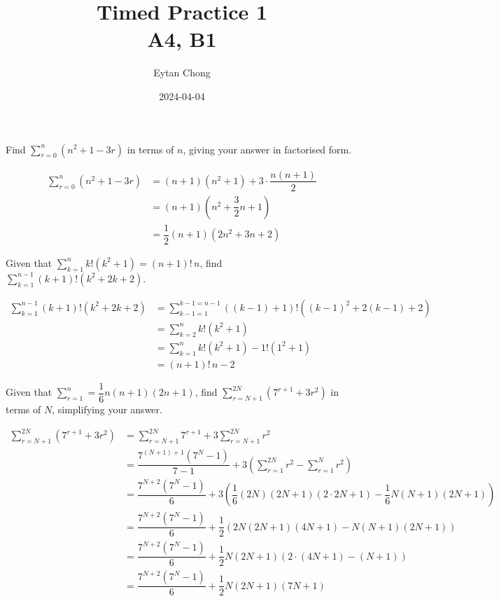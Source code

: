\documentclass{echw}
\title{Timed Practice 1\\A4, B1}
\author{Eytan Chong}
\date{2024-04-04}
\begin{document}
    \problem{}
        Find $\sum\limits_{r = 0}^n \left(n^2 + 1 - 3r\right)$ in terms of $n$, giving your answer in factorised form.

    \solution
        \begin{align*}
            \sum_{r = 0}^n \left(n^2 + 1 - 3r\right) &= (n+1)(n^2 + 1) + 3 \cdot \dfrac{n(n+1)}2\\
            &= (n+1)\left(n^2 + \dfrac32 n + 1\right)\\
            &= \dfrac12 (n+1)(2n^2 + 3n + 2)
        \end{align*}


    \problem{}
        Given that $\sum\limits_{k=1}^n k!\left(k^2 + 1\right) = (n+1)!\,n$, find $\sum\limits_{k=1}^{n-1} (k+1)!\left(k^2 + 2k + 2\right)$.

    \solution
        \begin{align*}
            \sum_{k=1}^{n-1} (k+1)!\left(k^2 + 2k + 2\right) &= \sum_{k-1=1}^{k-1=n-1} \left((k-1)+1\right)!\left((k-1)^2 + 2(k-1) + 2\right)\\
            &= \sum_{k=2}^{n} k! \left(k^2 + 1\right)\\
            &= \sum_{k=1}^{n} k! \left(k^2 + 1\right) - 1! \left(1^2 + 1\right)\\
            &= (n+1)! \, n - 2
        \end{align*}


    \problem{}
        Given that $\sum\limits_{r=1}^n = \dfrac16 n(n+1)(2n+1)$, find $\sum\limits_{r=N+1}^{2N} \left(7^{r+1} + 3r^2\right)$ in terms of $N$, simplifying your answer.

    \solution
        \begin{align*}
            \sum_{r=N+1}^{2N} \left(7^{r+1} + 3r^2\right) &= \sum_{r=N+1}^{2N} 7^{r+1} + 3\sum_{r=N+1}^{2N} r^2 \\
            &= \dfrac{7^{(N+1)+1}(7^N - 1)}{7-1} + 3\left(\sum_{r=1}^{2N} r^2 - \sum_{r=1}^{N} r^2\right)\\
            &= \dfrac{7^{N+2}(7^N - 1)}{6} + 3\left(\dfrac16 (2N)(2N+1)(2 \cdot 2N + 1) - \dfrac16 N(N+1)(2N+1)\right)\\
            &= \dfrac{7^{N+2}(7^N - 1)}{6} + \dfrac12\left(2N(2N+1)(4N + 1) - N(N+1)(2N+1)\right)\\
            &= \dfrac{7^{N+2}(7^N - 1)}{6} + \dfrac12 N(2N+1)(2 \cdot (4N + 1) - (N+1))\\
            &= \dfrac{7^{N+2}(7^N - 1)}{6} + \dfrac12 N(2N+1)(7N+1)
        \end{align*}
\end{document}
